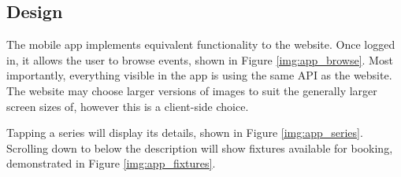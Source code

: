 \documentclass[12pt,a4paper]{bhamdissertation}
\begin{document}
\subsection{Design}

The mobile app implements equivalent functionality to the website. Once logged in, it allows the user to browse events, shown in Figure \ref{img:app_browse}. Most importantly, everything visible in the app is using the same API as the website. The website may choose larger versions of images to suit the generally larger screen sizes of, however this is a client-side choice.

Tapping a series will display its details, shown in Figure \ref{img:app_series}. Scrolling down to below the description will show fixtures available for booking, demonstrated in Figure \ref{img:app_fixtures}.
\end{document}
